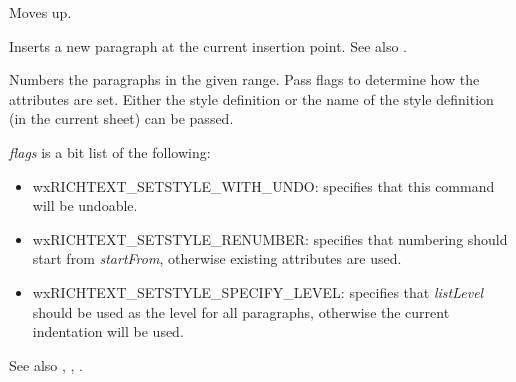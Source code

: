 \label{wxrichtextctrlmoveup}


Moves up.

\label{wxrichtextctrlnewline}


Inserts a new paragraph at the current insertion point. See also .

\label{wxrichtextctrlnumberlist}



Numbers the paragraphs in the given range. Pass flags to determine how the attributes are set.
Either the style definition or the name of the style definition (in the current sheet) can be passed.

{\it flags} is a bit list of the following:

\begin{itemize}\itemsep=0pt
\item wxRICHTEXT\_SETSTYLE\_WITH\_UNDO: specifies that this command will be undoable.
\item wxRICHTEXT\_SETSTYLE\_RENUMBER: specifies that numbering should start from {\it startFrom}, otherwise existing attributes are used.
\item wxRICHTEXT\_SETSTYLE\_SPECIFY\_LEVEL: specifies that {\it listLevel} should be used as the level for all paragraphs, otherwise the current indentation will be used.
\end{itemize}

See also , , .

\label{wxrichtextctrlonclear}

